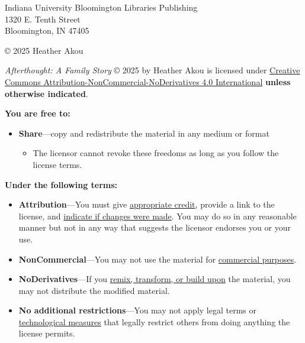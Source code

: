 \begin{flushleft}
\thispagestyle{empty}
\begin{small}
Indiana University Bloomington Libraries Publishing\\
1320 E. Tenth Street\\
Bloomington, IN 47405
\vspace{2mm}

© 2025 Heather Akou

\vspace{2mm}
\ccbyncnd

\textit{Afterthought: A Family Story} © 2025 by Heather Akou is licensed under \href{https://creativecommons.org/licenses/by-nc-nd/4.0/?ref=chooser-v1}{Creative Commons Attribution-NonCommercial-NoDerivatives 4.0 International} \textbf{unless otherwise indicated}.  

\textbf{You are free to:}
\begin{itemize}
\tightlist
\item \textbf{Share}---copy and redistribute the material in any medium or format
  \begin{itemize}
    \item The licensor cannot revoke these freedoms as long as you follow the license terms.
  \end{itemize}
\end{itemize}

\textbf{Under the following terms:}
\begin{itemize}
\tightlist
\item \textbf{Attribution}---You must give \href{https://creativecommons.org/licenses/by-nc-nd/4.0/?ref=chooser-v1#ref-appropriate-credit}{appropriate credit}, provide a link to the license, and \href{https://creativecommons.org/licenses/by-nc-nd/4.0/?ref=chooser-v1#ref-indicate-changes}{indicate if changes were made}. You may do so in any reasonable manner but not in any way that suggests the licensor endorses you or your use.\\
\item \textbf{NonCommercial}---You may not use the material for \href{https://creativecommons.org/licenses/by-nc-nd/4.0/?ref=chooser-v1#ref-commercial-purposes}{commercial purposes}.
\item \textbf{NoDerivatives}---If you \href{https://creativecommons.org/licenses/by-nc-nd/4.0/?ref=chooser-v1#ref-some-kinds-of-mods}{remix, transform, or build upon} the material, you may not distribute the modified material.
\item \textbf{No additional restrictions}---You may not apply legal terms or \href{https://creativecommons.org/licenses/by-nc-nd/4.0/?ref=chooser-v1#ref-technological-measures}{technological measures} that legally restrict others from doing anything the license permits.
\end{itemize}


\end{small}
\end{flushleft}
